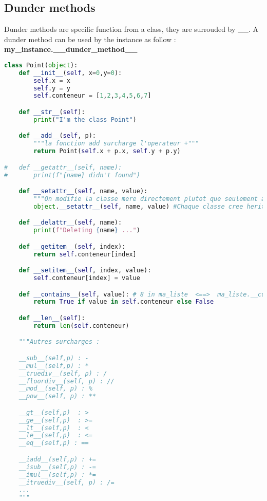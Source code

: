 \documentclass[a4paper, 12pt]{article}
\begin{document}
\subsection{Dunder methods}
Dunder methods are specific function from a class, they are surrouded by \_\_. A dunder method can be used by the instance as follow :\\ \textbf{my\_instance.\_\_dunder\_method\_\_}
\begin{lstlisting}[language=Python]
class Point(object):
	def __init__(self, x=0,y=0):
		self.x = x
		self.y = y
		self.conteneur = [1,2,3,4,5,6,7]

	def __str__(self):
		print("I'm the class Point")

	def __add__(self, p):
		"""la fonction add surcharge l'operateur +"""
		return Point(self.x + p.x, self.y + p.y)

#	def __getattr__(self, name):
#		print(f"{name} didn't found")

	def __setattr__(self, name, value):
		"""On modifie la classe mere directement plutot que seulement appeler setaatr de cette classe et tourner en boucle sur la meme methode"""
		object.__setattr__(self, name, value) #Chaque classe cree herite de base de la classe object

	def __delattr__(self, name):
		print(f"Deleting {name} ...")

	def __getitem__(self, index):
		return self.conteneur[index]

	def __setitem__(self, index, value):
		self.conteneur[index] = value

	def __contains__(self, value): # 8 in ma_liste  <==>  ma_liste.__contains__(8)
		return True if value in self.conteneur else False

	def __len__(self):
		return len(self.conteneur)

	"""Autres surcharges : 

	__sub__(self,p) : -
	__mul__(self,p) : *
	__truediv__(self, p) : /
	__floordiv__(self, p) : //
	__mod__(self, p) : %
	__pow__(self, p) : **

	__gt__(self,p)  : >
	__ge__(self,p) 	: >=
	__lt__(self,p)  : <
	__le__(self,p)  : <=
	__eq__(self,p) : == 

	__iadd__(self,p) : +=
	__isub__(self,p) : -=
	__imul__(self,p) : *=
	__itruediv__(self, p) : /=	
	...
	"""
\end{lstlisting}
\end{document}
